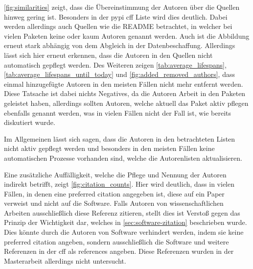 \autoref{fig:similarities} zeigt, dass die Übereinstimmung der Autoren über die Quellen hinweg gering ist.
Besonders in der \gls{pypi} \gls{cff} Liste wird dies deutlich.
Dabei werden allerdings auch Quellen wie die README betrachtet, in welcher bei vielen Paketen keine oder kaum Autoren genannt werden.
Auch ist die Abbildung erneut stark abhängig von dem Abgleich in der Datenbeschaffung.
Allerdings lässt sich hier erneut erkennen, dass die Autoren in den Quellen nicht automatisch gepflegt werden.
Des Weiteren zeigen \autoref{tab:average_lifespans}, \autoref{tab:average_lifespans_until_today} und \autoref{fig:added_removed_authors}, dass einmal hinzugefügte Autoren in den meisten Fällen nicht mehr entfernt werden.
Diese Tatsache ist dabei nichts Negatives, da die Autoren Arbeit in den Paketen geleistet haben, allerdings sollten Autoren, welche aktuell das Paket aktiv pflegen ebenfalls genannt werden, was in vielen Fällen nicht der Fall ist, wie bereits diskutiert wurde.

Im Allgemeinen lässt sich sagen, dass die Autoren in den betrachteten Listen nicht aktiv gepflegt werden und besonders in den meisten Fällen keine automatischen Prozesse vorhanden sind, welche die Autorenlisten aktualisieren.

Eine zusätzliche Auffälligkeit, welche die Pflege und Nennung der Autoren indirekt betrifft, zeigt \autoref{fig:citation_counts}.
Hier wird deutlich, dass in vielen Fällen, in denen eine \glqq preferred citation\grqq{} angegeben ist, diese auf ein Paper verweist und nicht auf die Software.
Falls Autoren von wissenschaftlichen Arbeiten ausschließlich diese Referenz zitieren, stellt dies ist Verstoß gegen das Prinzip der Wichtigkeit dar, welches in \autoref{sec:software-zitation} beschrieben wurde.
Dies könnte durch die Autoren von Software verhindert werden, indem sie keine \glqq preferred citation\grqq{} angeben, sondern ausschließlich die Software und weitere Referenzen in der \gls{cff} als \glqq references\grqq{} angeben.
Diese Referenzen wurden in der Masterarbeit allerdings nicht untersucht.
